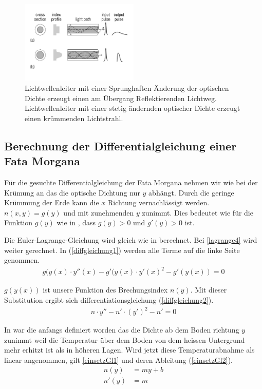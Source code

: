 \begin{figure}[H]
\begin{center}
\includegraphics[width=0.5\textwidth]{./picture/Lichtwellenleiter.pdf}
	\caption{Lichtwellenleiter mit einer Sprunghaften Änderung der optischen Dichte erzeugt einen am Übergang Reflektierenden Lichtweg. 
	Lichtwellenleiter mit einer stetig ändernden optischer Dichte erzeugt einen krümmenden Lichtstrahl.}
	\label{Ab:fataEinleitung}
\end{center}	
\end{figure}

\subsection{Berechnung der Differentialgleichung einer Fata Morgana}

Für die gesuchte Differentialgleichung der Fata Morgana nehmen wir wie bei der Krümung an das die optische Dichtung nur $y$ abhängt. Durch die geringe Krümmung der Erde kann die $x$ Richtung vernachlässigt werden.
$n(x,y) = g(y)$ und mit zunehmenden $y$ zunimmt. Dies bedeutet wie für die Funktion $g(y)$ wie in , dass $g(y) > 0$ und $g'(y) > 0 $ ist.

Die Euler-Lagrange-Gleichung wird gleich wie in  berechnet. Bei \eqref{lagrange4} wird weiter gerechnet. In (\eqref{diffgleichung1}) werden alle Terme auf die linke Seite genommen.
\begin{align}
	g(y(x)\cdot y''(x)-g'(y(x)\cdot y'(x)^2 - g'(y(x)) =0 
	\label{diffgleichung1}
\end{align}

$g(y(x))$ ist unsere Funktion des Brechungsindex $n(y)$. Mit dieser Substitution ergibt sich differentiationsgleichung (\eqref{diffgleichung2}).
\begin{align}
	n\cdot y''-n'\cdot (y')^2 - n' =0 
	\label{diffgleichung2}
\end{align}

In  war die anfangs definiert worden das die Dichte ab dem Boden richtung $y$ zunimmt weil die Temperatur über dem Boden von dem heissen Untergrund mehr erhitzt ist als in höheren Lagen. Wird jetzt diese Temperaturabnahme als linear angenommen, gilt \eqref{einsetzGl1} und deren Ableitung (\eqref{einsetzGl2}).
\begin{align}
	n(y)&=my+b \label{einsetzGl1} \\
	n'(y)&=m \label{einsetzGl2}
\end{align}

